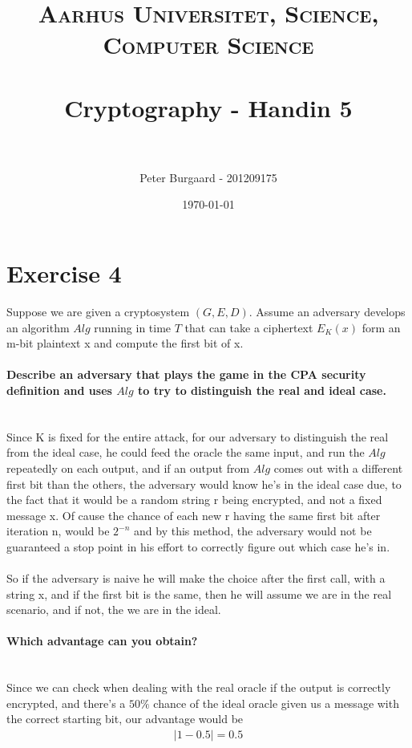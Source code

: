 \documentclass[paper=a4, fontsize=11pt]{scrartcl} %
\title{	
	\normalfont \normalsize 
	\textsc{Aarhus Universitet, Science, Computer Science} \\ [25pt] %
	\horrule{0.5pt} \\[0.4cm] %
	\huge Cryptography - Handin 5 \\ %
	\horrule{2pt} \\[0.5cm] %
}
\author{Peter Burgaard - 201209175} %
\date{\normalsize\today} %
\numberwithin{equation}{section} %
\numberwithin{figure}{section} %
\numberwithin{table}{section} %
\begin{document}
\maketitle

\section{Exercise 4}

Suppose we are given a cryptosystem $(G,E,D)$. Assume an adversary develops an algorithm $Alg$ running in time $T$ that can take a ciphertext $E_K(x)$ form an m-bit plaintext x and compute the first bit of x. 

\paragraph{Describe an adversary that plays the game in the CPA security definition and uses $Alg$ to try to distinguish the real and ideal case.}  \hspace{1cm} \\

Since K is fixed for the entire attack, for our adversary to distinguish the real from the ideal case, he could feed the oracle the same input, and run the $Alg$ repeatedly on each output, and if an output from $Alg$ comes out with a different first bit than the others, the adversary would know he's in the ideal case due, to the fact that it would be a random string r being encrypted, and not a fixed message x. Of cause the chance of each new r having the same first bit after iteration n, would be $2^{-n}$ and by this method, the adversary would not be guaranteed a stop point in his effort to correctly figure out which case he's in. \\ \\

So if the adversary is naive he will make the choice after the first call, with a string x, and if the first bit is the same, then he will assume we are in the real scenario, and if not, the we are in the ideal.

\paragraph{Which advantage can you obtain?} \hspace{1cm} \\

Since we can check when dealing with the real oracle if the output is correctly encrypted, and there's a $50\%$ chance of the ideal oracle given us a message with the correct starting bit, our advantage would be
\begin{align*}
|1-0.5|=0.5
\end{align*}
\end{document}
